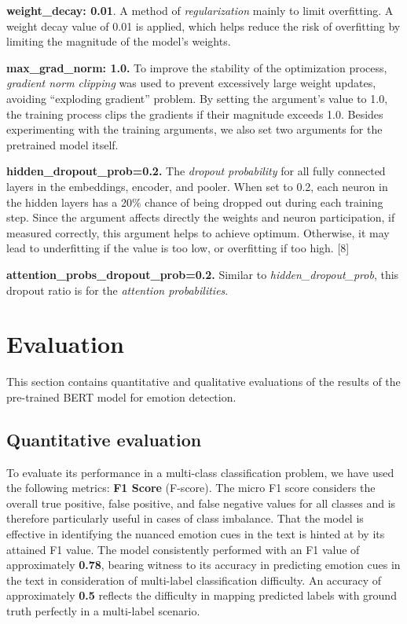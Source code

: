 \documentclass[11pt]{article}
\begin{document}
\textbf{weight\_decay: 0.01}. A method of \textit{regularization} mainly to limit overfitting. A weight decay value of 0.01 is applied, which helps reduce the risk of overfitting by limiting the magnitude of the model’s weights.

\textbf{max\_grad\_norm: 1.0. }To improve the stability of the optimization process, \textit{gradient norm clipping} was used to prevent excessively large weight updates, avoiding “exploding gradient” problem. By setting the argument’s value to 1.0, the training process clips the gradients if their magnitude exceeds 1.0. 
Besides experimenting with the training arguments, we also set two arguments for the pretrained model itself.

\textbf{hidden\_dropout\_prob=0.2.} The \textit{dropout probability} for all fully connected layers in the embeddings, encoder, and pooler. When set to 0.2, each neuron in the hidden layers has a 20\% chance of being dropped out during each training step. Since the argument affects directly the weights and neuron participation, if measured correctly, this argument helps to achieve optimum. Otherwise, it may lead to underfitting if the value is too low, or overfitting if too high. [8]

\textbf{attention\_probs\_dropout\_prob=0.2.} Similar to \textit{hidden\_dropout\_prob}, this dropout ratio is for the \textit{attention probabilities}. 


\section{Evaluation}
This section contains quantitative and qualitative evaluations of the results of the pre-trained BERT model for emotion detection.
\subsection{Quantitative evaluation}
To evaluate its performance in a multi-class classification problem, we have used the following metrics:
\textbf{F1 Score} (F-score). The micro F1 score considers the overall true positive, false positive, and false negative values for all classes and is therefore particularly useful in cases of class imbalance. That the model is effective in identifying the nuanced emotion cues in the text is hinted at by its attained F1 value. The model consistently performed with an F1 value of approximately \textbf{0.78}, bearing witness to its accuracy in predicting emotion cues in the text in consideration of multi-label classification difficulty. An accuracy of approximately \textbf{0.5} reflects the difficulty in mapping predicted labels with ground truth perfectly in a multi-label scenario.
\end{document}
